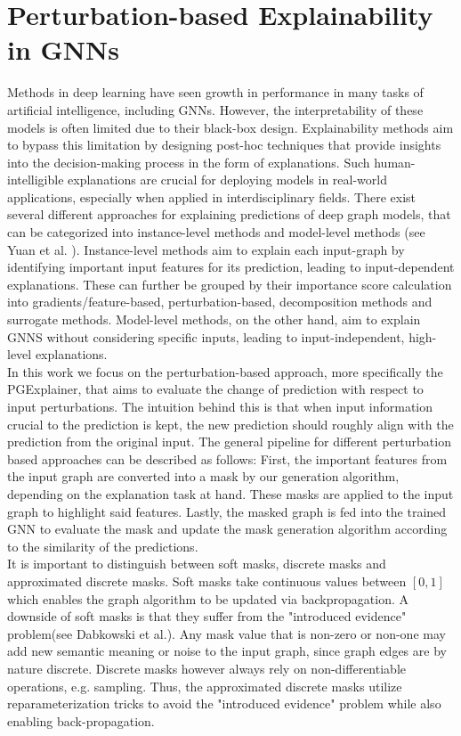 \section{Perturbation-based Explainability in GNNs}
Methods in deep learning have seen growth in performance in many tasks of artificial intelligence, including GNNs. However, the interpretability of these models is often limited due to their black-box design. Explainability methods aim to bypass this limitation by designing post-hoc techniques that provide insights into the decision-making process in the form of explanations. Such human-intelligible explanations are crucial for deploying models in real-world applications, especially when applied in interdisciplinary fields. There exist several different approaches for explaining predictions of deep graph models, that can be categorized into instance-level methods and model-level methods (see Yuan et al. \cite{yuan2022explainability}). Instance-level methods aim to explain each input-graph by identifying important input features for its prediction, leading to input-dependent explanations. These can further be grouped by their importance score calculation into gradients/feature-based, perturbation-based, decomposition methods and surrogate methods. Model-level methods, on the other hand, aim to explain GNNS without considering specific inputs, leading to input-independent, high-level explanations. \\
In this work we focus on the perturbation-based approach, more specifically the PGExplainer\cite{luo2020parameterized}, that aims to evaluate the change of prediction with respect to input perturbations. The intuition behind this is that when input information crucial to the prediction is kept, the new prediction should roughly align with the prediction from the original input. The general pipeline for different perturbation based approaches can be described as follows: First, the important features from the input graph are converted into a mask by our generation algorithm, depending on the explanation task at hand. These masks are applied to the input graph to highlight said features. Lastly, the masked graph is fed into the trained GNN to evaluate the mask and update the mask generation algorithm according to the similarity of the predictions. \\
It is important to distinguish between soft masks, discrete masks and approximated discrete masks. Soft masks take continuous values between $[0,1]$ which enables the graph algorithm to be updated via backpropagation. A downside of soft masks is that they suffer from the "introduced evidence" problem(see Dabkowski et al.\cite{ Dabkowski }). Any mask value that is non-zero or non-one may add new semantic meaning or noise to the input graph, since graph edges are by nature discrete. Discrete masks however always rely on non-differentiable operations, e.g. sampling. Thus, the approximated discrete masks utilize reparameterization tricks to avoid the "introduced evidence" problem while also enabling back-propagation. \\
